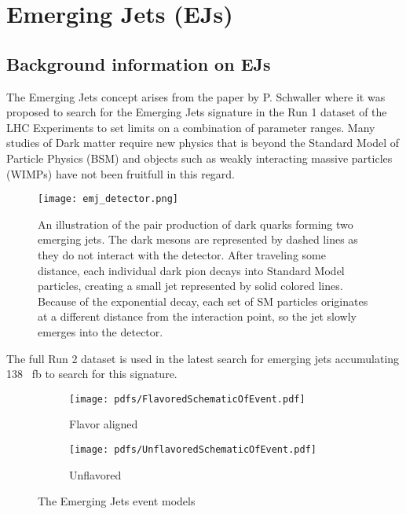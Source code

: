 \chapter{Emerging Jets (EJs) \label{ch:emj}}


\section{Background information on EJs}

The Emerging Jets concept arises from the paper by P. Schwaller \cite{Schwaller:2015gea} where it was proposed to search for the Emerging Jets signature in the Run 1 dataset of the LHC Experiments to set limits on a combination of parameter ranges. Many studies of Dark matter require new physics that is beyond the Standard Model of Particle Physics (BSM) and objects such as weakly interacting massive particles (WIMPs) have not been fruitfull in this regard.


\begin{figure}
	\centering
	\texttt{[image: emj\_detector.png]}
	\caption[Illustration of the emerging jets forming in the CMS detector]{An illustration of the pair production of dark quarks forming two emerging jets. The dark mesons are represented by dashed lines as they do not interact with the detector. After traveling some distance, each individual dark pion decays into Standard Model particles, creating a small jet represented by solid colored lines. Because of the exponential decay, each set of SM particles originates at a different distance from the interaction point, so the jet slowly emerges into the detector. }
	\label{fig:2emj_inCMS}
\end{figure}


The full Run 2 dataset is used in the latest search for emerging jets \cite{CMS:2024gxp} accumulating 138 \unit{\per\femto\barn} to search for this signature.



\begin{figure}
	\centering
	\begin{subfigure}{.45\linewidth}
		\texttt{[image: pdfs/FlavoredSchematicOfEvent.pdf]}
		\caption{Flavor aligned}
	\end{subfigure}
	\begin{subfigure}{.45\linewidth}
		\texttt{[image: pdfs/UnflavoredSchematicOfEvent.pdf]}
		\caption{Unflavored}
	\end{subfigure}
	\caption{The Emerging Jets event models}
	\label{fig:emj_production}
\end{figure}


